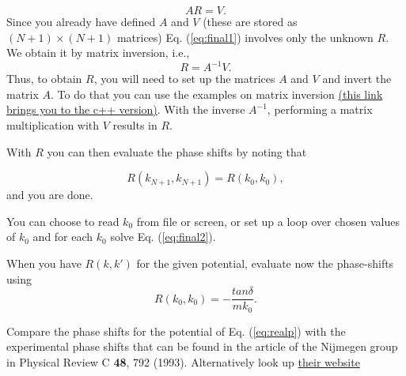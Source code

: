 \documentclass[%
oneside,                 %
final,                   %
10pt]{article}
\begin{document}
\begin{equation}
    AR=V.
    \label{eq:final1}
\end{equation}
Since you already have defined $A$ and $V$ (these are stored as $(N+1)\times (N+1)$ matrices)  Eq. (\ref{eq:final1}) involves only the unknown $R$. We obtain it by matrix inversion, i.e.,
\begin{equation} \label{eq:final2}
R=A^{-1}V.     
\end{equation}
Thus, to obtain $R$, you will need to set up the matrices
$A$ and $V$ and invert the matrix $A$. To do that
you can use the examples on matrix inversion \href{{https://github.com/ManyBodyPhysics/NuclearForces/tree/master/doc/Programs/ScatteringTheory/Cpp/MatrixInverse}}{(this link brings you to the c++ version)}.
With the inverse $A^{-1}$, performing
a matrix multiplication with $V$ results in $R$.


With $R$ you can then evaluate the phase shifts
by noting that

\begin{equation}
      R(k_{N+1},k_{N+1})=R(k_0,k_0),
\end{equation}
and you are done.

You can choose to read $k_0$ from file or screen, or set up
a loop over chosen values of $k_0$ and for each
$k_0$ solve Eq. (\ref{eq:final2}). 




When you have $R(k,k')$ for the given potential, evaluate now the phase-shifts  using
\begin{equation*}
R(k_0,k_0)=-\frac{tan\delta}{mk_0}.
\end{equation*}

Compare the phase shifts for the potential of Eq. (\ref{eq:realp}) with the  experimental phase shifts that can be found  in the article  of the Nijmegen group in Physical Review C \textbf{48}, 792 (1993).  Alternatively look up \href{{http://nn-online.org/}}{their website}
\end{document}

